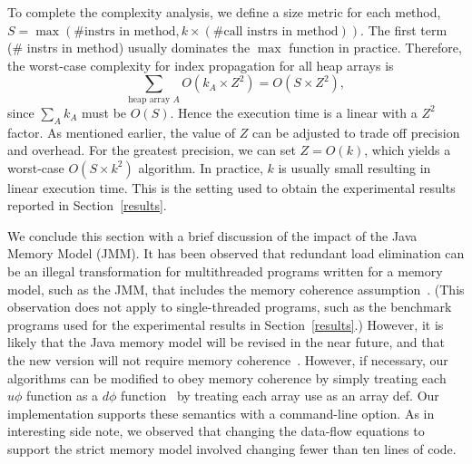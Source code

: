 To complete the complexity analysis, we define a size metric for
each method, $S = \max(\mbox{\# instrs in method}, k \times (\mbox{\# call instrs in method}))$.
The first term (\# instrs in method) usually dominates the $\max$ function in practice.
Therefore,
the worst-case complexity for index propagation
for all heap arrays is
$$
\sum_{\mbox{heap array $A$}} O(k_A \times Z^2) = O(S \times Z^2),
$$
since $\sum_A k_A$ must be $O(S)$.
Hence the execution time is a linear with a $Z^2$ factor.
As mentioned earlier, the value of $Z$ can be adjusted to trade off
precision and overhead.  For the greatest precision, we can set $Z = O(k)$, which yields a worst-case
$O(S \times k^2)$
algorithm.  
In practice, $k$ is usually small resulting in linear execution time.
This is the setting used to obtain the experimental results reported
in Section~\ref{results}.

We conclude this section with a brief discussion of the impact of
the Java Memory Model (JMM).
It has been observed that redundant load elimination
can be an illegal
transformation for multithreaded programs written for a
memory model, such as the JMM,
that includes the memory coherence
assumption~\cite{pugh99}. 
(This observation does not apply to single-threaded programs, such
as the benchmark programs used for the experimental results
in Section~\ref{results}.)
However, it is likely that the Java memory model will be revised
in the near future,
and that the new version will not require memory coherence~\cite{pugh99b}.
However, if necessary, our algorithms can be modified to 
obey memory coherence by simply treating each $u\phi$ function 
as a $d\phi$ function \ie\ by treating each array use as an array def.
Our implementation supports these semantics with a command-line option.
As in interesting side note, we observed that changing
the data-flow equations to support the strict memory model involved
changing fewer than ten lines of code.


